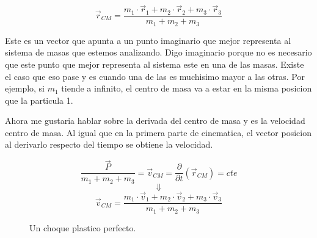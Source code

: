 \documentclass[../Main.tex]{subfiles}
\begin{document}
\begin{minipage}[t]{0.6\textwidth}
\begin{equation}
    \vec{r} _{CM} = \frac{m_1 \cdot \vec{r} _1 + m_2 \cdot \vec{r} _2 + m_3 \cdot \vec{r} _3}{m_1 + m_2 + m_3}
    \label{eq:rc}
\end{equation}

Este es un vector que apunta a un punto imaginario que mejor representa al
sistema de masas que estemos analizando. Digo imaginario porque no es
necesario que este punto que mejor representa al sistema este en una de las
masas. Existe el caso que eso pase y es cuando una de las es muchisimo mayor
a las otras. Por ejemplo, si $m_1$ tiende a infinito, el centro de masa
va a estar en la misma posicion que la particula 1.

Ahora me gustaria hablar sobre la derivada del centro de masa y es la velocidad
centro de masa. Al igual que en la primera parte de cinematica, el vector
posicion al derivarlo respecto del tiempo se obtiene la velocidad.

\begin{equation*}
    \frac{\vec{P}}{m_1 + m_2 + m_3} = \vec{v}_{CM} = \frac{\partial}{\partial t} \left(\vec{r} _{CM}\right) = cte
\end{equation*}
\begin{equation*}
    \Downarrow
\end{equation*}
\begin{equation}
    \vec{v}_{CM} = \frac{m_1 \cdot \vec{v} _1 + m_2 \cdot \vec{v} _2 + m_3 \cdot \vec{v} _3}{m_1 + m_2 + m_3}
    \label{eq:vc}
\end{equation}

\end{minipage}
\newpage
\begin{minipage}[t]{0.3\textwidth}
\begin{figure}[H]
\centering
{}
\caption{Un choque plastico perfecto.}
\label{fg:choque}
\end{figure}

\end{minipage}
\end{document}
